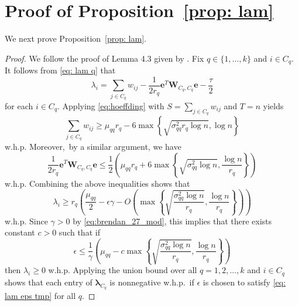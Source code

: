 \documentclass[twoside,11pt]{article}
\newcommand{\bs}{\boldsymbol}
\newcommand{\0}{\bs{0}}
\newcommand{\rbra}[1]{\ensuremath{\left( #1 \right)}} %
\newcommand{\bra}[1]{\ensuremath{\left\{ #1 \right\}}} %
\begin{document}
{%
\section{Proof of Proposition~\ref{prop: lam}}
\label{app: lam}
We next prove Proposition~\ref{prop: lam}.
\begin{proof}
We follow the proof of Lemma 4.3 given by \cite{ames2014guaranteed}. Fix $q \in \{1,\dots,k\}$ and $i \in C_q$.
It follows from \eqref{eq: lam q} that
\[
\lambda_i = \sum_{j \in C_q} w_{ij} - \frac{1}{2r_q}\bs{e}^T\bs{W}_{C_q,C_q}\bs{e}-\frac{\tau}{2}
\]
for each \(i \in C_q\).
Applying \eqref{eq:hoeffding} with ${S} = \sum_{j \in C_q} w_{ij}$ and $T = n$ yields
\[
	\sum_{j \in C_q} w_{ij} \geq \mu_{qq} r_q
		- 6 \max \bra{ \sqrt{ \sigma_{qq}^2 r_q \log n }, \log n}
\]
w.h.p. Moreover,~by a similar argument, we have
\[
	\frac{1}{2r_q}\bs{e}^T\bs{W}_{C_q,C_q}\bs{e}
	\leq \frac{1}{2}\left(\mu_{qq} r_q +
	6 \max\bra{ \sqrt{\sigma_{qq}^2 \log n}, \frac{\log n}{r_q} }\right)
\]
w.h.p.
Combining the above inequalities shows that
\[
	\lambda_i \geq	r_q \rbra{ \frac{\mu_{qq}}{2} - \epsilon \gamma
		- O \rbra{ \max \bra{ \sqrt{  \frac{\sigma_{qq}^2 \log n }{r_q} },
			\frac{\log n }{r_q} } } }
\]
w.h.p.
Since $\gamma > 0$ by \eqref{eq:brendan_27_mod}, this implies that
there exists constant $c>0$ such that if
\begin{equation} \label{eq: lam eps tmp}
	\epsilon \leq \frac{1}{\gamma}
	\rbra{ \mu_{qq}  - c \max \bra{ \sqrt{  \frac{\sigma_{qq}^2 \log 		n }{r_q} },
			\frac{\log n }{r_q} } }
\end{equation}
then
$\lambda_i \geq 0$ w.h.p.
Applying the union bound over all \(q =1,2,\dots, k\) and
\(i\in C_q\) shows that each entry of $\bs{\lambda}_{C_q}$ is nonnegative w.h.p.~if \(\epsilon\) is chosen to satisfy \eqref{eq: lam eps tmp} for all $q$.
\end{proof}

}
\end{document}
